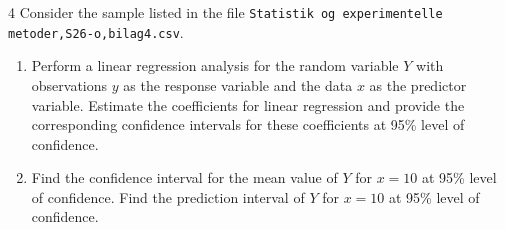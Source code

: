 
    \begin{problem}{4}
      Consider the sample listed in the file \verb#Statistik og experimentelle metoder,S26-o,bilag4.csv#.
      \begin{enumerate}[label=\alph*)]
        \item Perform a linear regression analysis for the random variable $Y$ with observations $y$ as the response variable and the data $x$ as the predictor variable.
          Estimate the coefficients for linear regression and provide the corresponding confidence intervals for these coefficients at 95\% level of confidence.
        \item Find the confidence interval for the mean value of $Y$ for $x= 10$ at 95\% level of confidence.
          Find the prediction interval of $Y$ for $x = 10$ at 95\% level of confidence.
      \end{enumerate}
    \end{problem}

